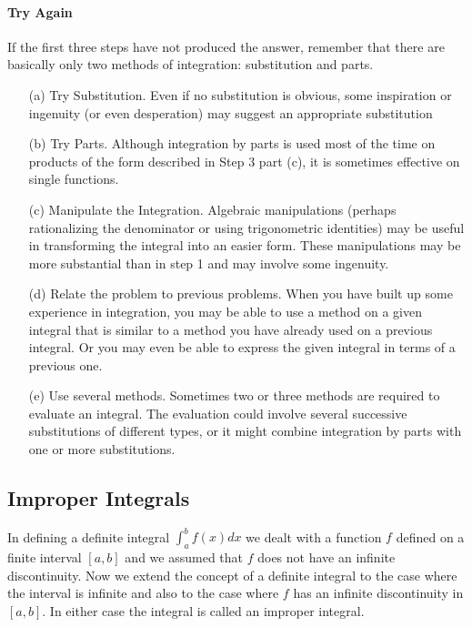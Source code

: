 \documentclass[10pt]{report}
\begin{document}
\paragraph{Try Again}
If the first three steps have not produced the answer, remember that there are basically only two methods of integration: substitution and parts.
\begin{itemize}
\item[(a)] Try Substitution. Even if no substitution is obvious, some inspiration or ingenuity (or even desperation) may suggest an appropriate substitution
\item[(b)] Try Parts. Although integration by parts is used most of the time on products of the form described in Step 3 part (c), it is sometimes effective on single functions.
\item[(c)] Manipulate the Integration. Algebraic manipulations (perhaps rationalizing the denominator or using trigonometric identities) may be useful in transforming the integral into an easier form. These manipulations may be more substantial than in step 1 and may involve some ingenuity. 
\item[(d)] Relate the problem to previous problems. When you have built up some experience in integration, you may be able to use a method on a given integral that is similar to a method you have already used on a previous integral. Or you may even be able to express the given integral in terms of a previous one. 
\item[(e)] Use several methods. Sometimes two or three methods are required to evaluate an integral. The evaluation could involve several successive substitutions of different types, or it might combine integration by parts with one or more substitutions.
\end{itemize}

\subsection{Improper Integrals}
In defining a definite integral $\int_a^b f(x)dx$ we dealt with a function $f$ defined on a finite interval $[a,b]$ and we assumed that $f$ does not have an infinite discontinuity. Now we extend the concept of a definite integral to the case where the interval is infinite and also to the case where $f$ has an infinite discontinuity in $[a,b]$. In either case the integral is called an improper integral.
\end{document}
